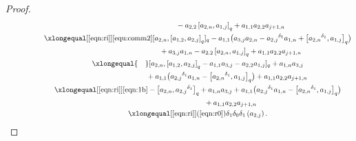 \documentclass[pdftex]{sigma}
\numberwithin{equation}{section}
\def\lr#1{\left[#1\right]}
\def\lrb#1{\left(#1\right)}
\def\d{\delta}
\begin{document}
\begin{proof}
\begin{gather*}
 \phantom{ \d_0\d_1\d_0\lrb{a_{2,j}} \xlongequal{\qquad}}{} -a_{2,2}\lr{a_{2,n}, a_{1,j}}_q+a_{1,1}a_{2,2}a_{j+1,n}\\
 \phantom{ \d_0\d_1\d_0\lrb{a_{2,j}}}{} \xlongequal[\eqref{eqn:ri}]{\eqref{equ:comm2}} [a_{2,n},\lr{a_{1,2}, a_{2,j}}_q]_q -a_{1,1}\bigl(a_{3,j}a_{2,n} - {a_{2,j}}^{\d_1}a_{1,n}+\bigl[ {a_{2,n}}^{\d_1}, a_{1,j}\bigr]_q\bigr) \\
 \phantom{ \d_0\d_1\d_0\lrb{a_{2,j}}\xlongequal{\qquad}}{} +a_{3,j}a_{1,n}-a_{2,2}\lr{a_{2,n}, a_{1,j}}_q +a_{1,1}a_{2,2}a_{j+1,n}\\
 \phantom{ \d_0\d_1\d_0\lrb{a_{2,j}}}{} \xlongequal{\quad} [a_{2,n},\lr{a_{1,2}, a_{2,j}}_q -a_{1,1}a_{3,j} -a_{2,2}a_{1,j}]_q+a_{1,n}a_{3,j} \\
 \phantom{ \d_0\d_1\d_0\lrb{a_{2,j}} \xlongequal{\quad} }{} +a_{1,1} \bigl({a_{2,j}}^{\d_1}a_{1,n} - \bigl[ {a_{2,n}}^{\d_1}, a_{1,j}\bigr]_q\bigr)+a_{1,1}a_{2,2}a_{j+1,n}\\
 \phantom{ \d_0\d_1\d_0\lrb{a_{2,j}}}{} \xlongequal[\eqref{eqn:ri}]{\eqref{eqn:1b}} -\bigl[a_{2,n} , {a_{2,j}}^{\d_1}\bigr]_q+a_{1,n}a_{3,j} +a_{1,1} \bigl({a_{2,j}}^{\d_1}a_{1,n}-\bigl[ {a_{2,n}}^{\d_1}, a_{1,j}\bigr]_q\bigr)\\
 \phantom{ \d_0\d_1\d_0\lrb{a_{2,j}} \xlongequal{\qquad} }{} +a_{1,1}a_{2,2}a_{j+1,n}\\
 \phantom{ \d_0\d_1\d_0\lrb{a_{2,j}}}{} \xlongequal[\eqref{eqn:ri}]{\lrb{\ref{eqn:r0}}} \d_1\d_0\d_1\lrb{a_{2,j}}.
\end{gather*}


\end{proof}
\end{document}
